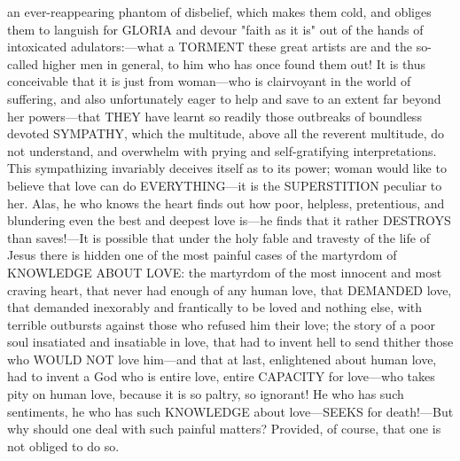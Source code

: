 \documentclass[12pt]{article}
\begin{document}
an ever-reappearing phantom of disbelief, which makes them cold, and obliges them to languish for GLORIA and devour "faith as it is" out of the hands of intoxicated adulators:---what a TORMENT these great artists are and the so-called higher men in general, to him who has once found them out! It is thus conceivable that it is just from woman---who is clairvoyant in the world of suffering, and also unfortunately eager to help and save to an extent far beyond her powers---that THEY have learnt so readily those outbreaks of boundless devoted SYMPATHY, which the multitude, above all the reverent multitude, do not understand, and overwhelm with prying and self-gratifying interpretations. This sympathizing invariably deceives itself as to its power; woman would like to believe that love can do EVERYTHING---it is the SUPERSTITION peculiar to her. Alas, he who knows the heart finds out how poor, helpless, pretentious, and blundering even the best and deepest love is---he finds that it rather DESTROYS than saves!---It is possible that under the holy fable and travesty of the life of Jesus there is hidden one of the most painful cases of the martyrdom of KNOWLEDGE ABOUT LOVE: the martyrdom of the most innocent and most craving heart, that never had enough of any human love, that DEMANDED love, that demanded inexorably and frantically to be loved and nothing else, with terrible outbursts against those who refused him their love; the story of a poor soul insatiated and insatiable in love, that had to invent hell to send thither those who WOULD NOT love him---and that at last, enlightened about human love, had to invent a God who is entire love, entire CAPACITY for love---who takes pity on human love, because it is so paltry, so ignorant! He who has such sentiments, he who has such KNOWLEDGE about love---SEEKS for death!---But why should one deal with such painful matters? Provided, of course, that one is not obliged to do so.
\end{document}
